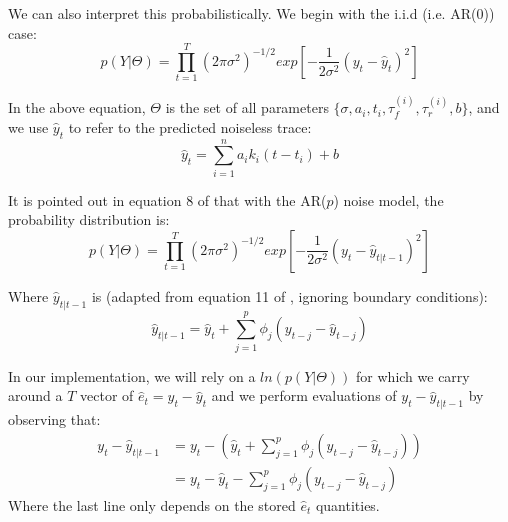 \documentclass{article}
\begin{document}
We can also interpret this probabilistically.  We begin with the i.i.d (i.e. AR($0$)) case:
\begin{equation}
p(Y|\Theta) = \prod_{t=1}^T (2\pi\sigma^2)^{-1/2} exp[-\frac{1}{2\sigma^2}(y_t - \hat y_t)^2]
\end{equation}

In the above equation, $\Theta$ is the set of all parameters $\{\sigma,a_i,t_i,\tau_f^{(i)}, \tau_r^{(i)},b \}$, and we use $\hat y_t$ to refer to the predicted noiseless trace:
\begin{equation}
\hat y_t = \sum_{i=1}^n a_{i} k_i(t-t_{i}) + b
\end{equation} 

It is pointed out in equation 8 of \cite{chib1994bayes} that with the AR($p$) noise model, the probability distribution is:
\begin{equation}
\label{main_likelihood}
p(Y|\Theta) = \prod_{t=1}^T (2\pi\sigma^2)^{-1/2} exp[-\frac{1}{2\sigma^2}(y_t - \hat y_{t|t-1})^2]
\end{equation}

Where $\hat y_{t|t-1}$ is (adapted from equation 11 of \cite{chib1994bayes}, ignoring boundary conditions):
\begin{equation}
\hat y_{t|t-1} = \hat y_t + \sum_{j=1}^p \phi_j (y_{t-j} - \hat y_{t-j})
\end{equation} 

In our implementation, we will rely on a $ln(p(Y|\Theta))$ for which we carry around a $T$ vector of $\hat e_t = y_t - \hat y_t$ and we perform evaluations of $y_t - \hat y_{t|t-1}$ by observing that:
\begin{align}
y_t - \hat y_{t|t-1} &= y_t - (\hat y_t + \sum_{j=1}^p \phi_j (y_{t-j} - \hat y_{t-j})) \\
&= y_t - \hat y_t - \sum_{j=1}^p \phi_j (y_{t-j} - \hat y_{t-j})
\end{align}
Where the last line only depends on the stored $\hat e_t$ quantities.
\end{document}
